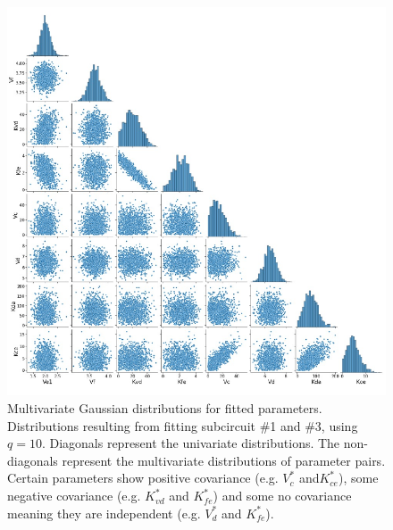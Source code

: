 \begin{figure}[H] %
    \centering
    \begin{adjustbox}{center}
        \includegraphics[width=1\textwidth]{chapters/Chapter 2/multivariate_from_fit} %
    \end{adjustbox}
    \caption{Multivariate Gaussian distributions for fitted parameters.
    Distributions resulting from fitting subcircuit \#1 and \#3, using $q=10$.
    Diagonals represent the univariate distributions.
    The non-diagonals represent the multivariate distributions of parameter pairs.
    Certain parameters show positive covariance (e.g. $V^*_c$ and$ K^*_{ce}$), some negative covariance (e.g. $K^*_{vd}$ and $K^*_{fe}$) and some no covariance
    meaning they are independent (e.g. $V^*_{d}$ and $K^*_{fe}$). }
    \label{fig:multivariate_from_fit} %
\end{figure}

